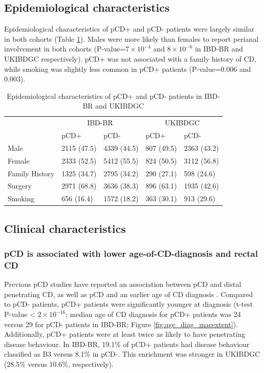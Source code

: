 \subsection{Epidemiological characteristics}
Epidemiological characteristics of pCD+ and pCD- patients were largely similar in both cohorts (Table \ref{table:epidem}). Males were more likely than females to report perianal involvement in both cohorts (P-value={$7\times10^{-4}$} and {$8\times10^{-6}$} in IBD-BR and UKIBDGC respectively). pCD+ was not associated with a family history of CD, while smoking was slightly less common in pCD+ patients (P-value=0.006 and 0.003).
\setlength{\tabcolsep}{10pt} 
\renewcommand{\arraystretch}{1.5}
\begin{table}[H]
  \caption{Epidemiological characteristics of pCD+ and pCD- patients in IBD-BR and UKIBDGC}
  \label{table:epidem}
  \centering
  \begin{tabular}[t]{lllll}
  \toprule
  \multicolumn{1}{c}{ } & \multicolumn{2}{c}{IBD-BR} & \multicolumn{2}{c}{UKIBDGC} \\
  \cmidrule(l{3pt}r{3pt}){2-3} \cmidrule(l{3pt}r{3pt}){4-5}
   & pCD+ & pCD- & pCD+ & pCD-\\
  \midrule
  Male & 2115 (47.5) & 4339 (44.5) & 807 (49.5) & 2363 (43.2)\\
  Female & 2333 (52.5) & 5412 (55.5) & 824 (50.5) & 3112 (56.8)\\
  Family History & 1325 (34.7) & 2795 (34.2) & 290 (27.1) & 598 (24.6)\\
  Surgery & 2971 (68.8) & 3636 (38.3) & 896 (63.1) & 1935 (42.6)\\
  Smoking & 656 (16.4) & 1572 (18.2) & 363 (30.1) & 913 (29.6)\\
  \bottomrule
  \end{tabular}
  \end{table}


  \subsection{Clinical characteristics}
\subsubsection{pCD is associated with lower age-of-CD-diagnosis and rectal CD}

Previous pCD studies have reported an association between pCD and distal penetrating CD, as well as pCD and an earlier age of CD diagnosis \cite{Duricova2014-gf,Kaur2016-bs}. Compared to pCD- patients, pCD+ patients were significantly younger at diagnosis (t-test P-value < $2\times10^{-16}$; median age of CD diagnosis for pCD+ patients was 24 versus 29 for pCD- patients in IBD-BR; Figure \ref{fig:age_diag_macextent}). Additionally, pCD+ patients were at least twice as likely to have penetrating disease behaviour. In IBD-BR, 19.1\% of pCD+ patients had disease behaviour classified as B3 versus 8.1\% in pCD-. This enrichment was stronger in UKIBDGC (28.5\% versus 10.6\%, respectively). \\

